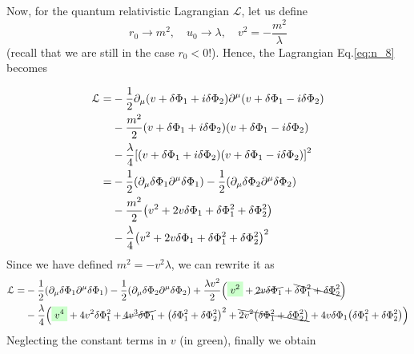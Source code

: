 \documentclass[../main/main.tex]{subfiles}
\begin{document}
Now, for the quantum relativistic Lagrangian \( \mathcal{L} \), let us define
\begin{equation*}
  r_0 \rightarrow m^2, \quad u_0 \rightarrow \lambda , \quad v^2 = - \frac{m^2}{\lambda }
\end{equation*}
(recall that we are still in the case \( r_0<0 \)!).
Hence, the Lagrangian Eq.\eqref{eq:n_8} becomes

\begin{equation*}
\begin{split}
\mathcal{L}  = & - \frac{1}{2} \partial _ \mu \qty(v+\delta \Phi _1 + i \delta \Phi _2)   \partial ^\mu \qty(v+\delta \Phi _1 - i \delta \Phi _2)  \\
 & - \frac{m^2}{2} \qty(v + \delta \Phi _1 + i \delta \Phi _2) \qty(v + \delta \Phi _1 - i \delta \Phi _2) \\
 & - \frac{\lambda }{4} \qty[ \qty(v + \delta \Phi _1 + i \delta \Phi _2) \qty(v + \delta \Phi _1 - i \delta \Phi _2) ] ^2 \\
 =& - \frac{1}{2} \qty(\partial_ \mu  \delta \Phi _1 \partial^ \mu \delta \Phi _1  )
 - \frac{1}{2} \qty( \partial_ \mu  \delta \Phi _2 \partial^\mu \delta \Phi _2  )  \\
 & - \frac{m^2}{2} \qty(v^2 + 2 v \delta \Phi _1 + \delta \Phi _1^2 + \delta \Phi _2^2) \\
 &- \frac{\lambda }{4} \qty(v^2 + 2 v \delta \Phi _1 + \delta \Phi _1^2 + \delta \Phi _2 ^2)^2
\end{split}
\end{equation*}
Since we have defined \( m^2 = - v^2 \lambda  \), we can rewrite it as
\begin{equation*}
\begin{split}
\mathcal{L}   = &  - \frac{1}{2} \qty(\partial_ \mu  \delta \Phi _1 \partial^ \mu \delta \Phi _1  )
- \frac{1}{2} \qty( \partial_ \mu  \delta \Phi _2 \partial^ \mu \delta \Phi _2  )
 + \frac{\lambda v^2}{2} \qty( \mathcolorbox{green!20}{v^2} + \cancel{2 v \delta \Phi _1}  +  \bcancel{\delta \Phi _1^2 + \delta \Phi _2^2})  \\
& - \frac{\lambda }{4} \qty( \mathcolorbox{green!20}{v^4} + 4 v^2 \delta \Phi _1^2
  +   \cancel{4 v^3 \delta \Phi _1}  +  \qty(\delta \Phi _1^2 + \delta \Phi _2^2)^2 + \bcancel{2 v^2 \qty(\delta \Phi _1^2 + \delta \Phi _2^2)} + 4 v \delta \Phi _1 \qty(\delta \Phi _1^2 + \delta \Phi _2^2)   )
\end{split}
\end{equation*}
Neglecting the constant terms in \( v \) (in green), finally we obtain
\end{document}
